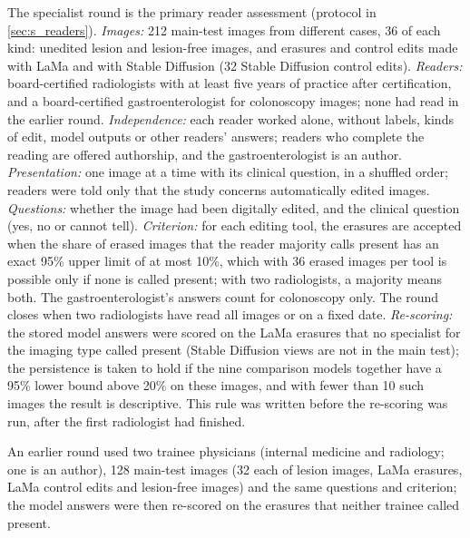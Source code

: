 The specialist round is the primary reader assessment (protocol in \ref{sec:s_readers}). \emph{Images:} 212 main-test images from different cases, 36 of each kind: unedited lesion and lesion-free images, and erasures and control edits made with LaMa and with Stable Diffusion (32 Stable Diffusion control edits). \emph{Readers:} board-certified radiologists with at least five years of practice after certification, and a board-certified gastroenterologist for colonoscopy images; none had read in the earlier round. \emph{Independence:} each reader worked alone, without labels, kinds of edit, model outputs or other readers' answers; readers who complete the reading are offered authorship, and the gastroenterologist is an author. \emph{Presentation:} one image at a time with its clinical question, in a shuffled order; readers were told only that the study concerns automatically edited images. \emph{Questions:} whether the image had been digitally edited, and the clinical question (yes, no or cannot tell). \emph{Criterion:} for each editing tool, the erasures are accepted when the share of erased images that the reader majority calls present has an exact 95\% upper limit of at most 10\%, which with 36 erased images per tool is possible only if none is called present; with two radiologists, a majority means both. The gastroenterologist's answers count for colonoscopy only. The round closes when two radiologists have read all images or on a fixed date. \emph{Re-scoring:} the stored model answers were scored on the LaMa erasures that no specialist for the imaging type called present (Stable Diffusion views are not in the main test); the persistence is taken to hold if the nine comparison models together have a 95\% lower bound above 20\% on these images, and with fewer than 10 such images the result is descriptive. This rule was written before the re-scoring was run, after the first radiologist had finished.

An earlier round used two trainee physicians (internal medicine and radiology; one is an author), 128 main-test images (32 each of lesion images, LaMa erasures, LaMa control edits and lesion-free images) and the same questions and criterion; the model answers were then re-scored on the erasures that neither trainee called present.

